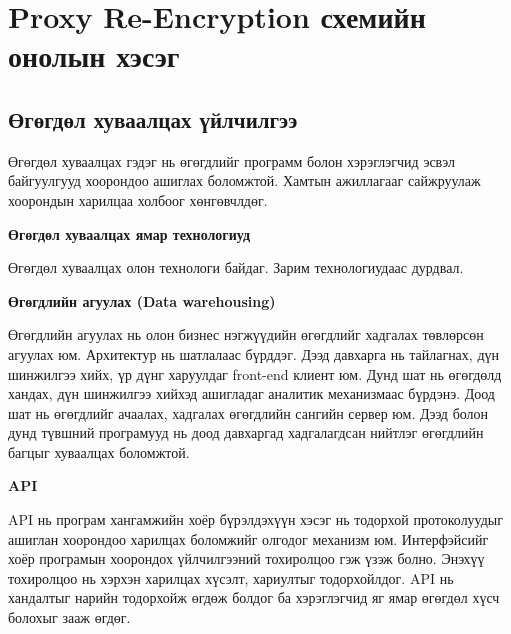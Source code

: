
\chapter{Proxy Re-Encryption схемийн онолын хэсэг} %
\label{Chapter1} %
\pagecolor{white}

\newcommand{\keyword}[1]{\textbf{#1}}
\newcommand{\tabhead}[1]{\textbf{#1}}
\newcommand{\code}[1]{\texttt{#1}}
\newcommand{\file}[1]{\texttt{\bfseries#1}}
\newcommand{\option}[1]{\texttt{\itshape#1}}


\section{Өгөгдөл хуваалцах үйлчилгээ}
Өгөгдөл хуваалцах гэдэг нь өгөгдлийг программ болон хэрэглэгчид эсвэл байгуулгууд хоорондоо ашиглах боломжтой.
Хамтын ажиллагааг сайжруулаж хоорондын харилцаа холбоог хөнгөвчлдөг.

\textbf{Өгөгдөл хуваалцах ямар технологиуд}

Өгөгдөл хуваалцах олон технологи байдаг. Зарим технологиудаас дурдвал.

\textbf{Өгөгдлийн агуулах (Data warehousing)}

Өгөгдлийн агуулах нь олон бизнес нэгжүүдийн өгөгдлийг хадгалах төвлөрсөн агуулах юм. Архитектур нь шатлалаас бүрддэг. Дээд давхарга нь тайлагнах, дүн шинжилгээ хийх, үр дүнг харуулдаг front-end клиент юм. Дунд шат нь өгөгдөлд хандах, дүн шинжилгээ хийхэд ашигладаг аналитик механизмаас бүрдэнэ. Доод шат нь өгөгдлийг ачаалах, хадгалах өгөгдлийн сангийн сервер юм. Дээд болон дунд түвшний програмууд нь доод давхаргад хадгалагдсан нийтлэг өгөгдлийн багцыг хуваалцах боломжтой.

\textbf{API}

API нь програм хангамжийн хоёр бүрэлдэхүүн хэсэг нь тодорхой протоколуудыг ашиглан хоорондоо харилцах боломжийг олгодог механизм юм. Интерфэйсийг хоёр програмын хоорондох үйлчилгээний тохиролцоо гэж үзэж болно. Энэхүү тохиролцоо нь хэрхэн харилцах  хүсэлт, хариултыг тодорхойлдог. API нь хандалтыг нарийн тодорхойж өгдөж болдог ба хэрэглэгчид яг ямар өгөгдөл хүсч болохыг зааж өгдөг.


